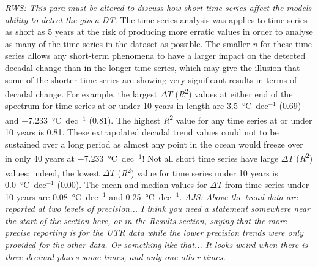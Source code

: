 \documentclass{ametsoc}
\begin{document}
\emph{RWS: This para must be altered to discuss how short time series affect the models ability to detect the given DT.}
The time series analysis was applies to time series as short as 5 years at the risk of producing more erratic values in order to analyse as many of the time series in the dataset as possible. The smaller \emph{n} for these time series allows any short-term phenomena to have a larger impact on the detected decadal change than in the longer time series, which may give the illusion that some of the shorter time series are showing very significant results in terms of decadal change. For example, the largest $\Delta T$ (\emph{R}\textsuperscript{2}) values at either end of the spectrum for time series at or under 10 years in length are \SI{3.5}{\degreeCelsius}~dec$^{-1}$ (0.69) and \SI{-7.233}{\degreeCelsius}~dec$^{-1}$ (0.81). The highest \emph{R}\textsuperscript{2} value for any time series at or under 10 years is 0.81. These extrapolated decadal trend values could not to be sustained over a long period as almost any point in the ocean would freeze over in only 40 years at \SI{-7.233}{\degreeCelsius}~dec$^{-1}$! Not all short time series have large $\Delta T$ (\emph{R}\textsuperscript{2}) values; indeed, the lowest $\Delta T$ (\emph{R}\textsuperscript{2}) value for time series under 10 years is \SI{0.0}{\degreeCelsius}~dec$^{-1}$ (0.00). The mean and median values for $\Delta T$ from time series under 10 years are \SI{0.08}{\degreeCelsius}~dec$^{-1}$ and \SI{0.25}{\degreeCelsius}~dec$^{-1}$.
\emph{AJS: Above the trend data are reported at two levels of precision... I think you need a statement somewhere near the start of the section here, or in the Results section, saying that the more precise reporting is for the UTR data while the lower precision trends were only provided for the other data. Or something like that... It looks weird when there is three decimal places some times, and only one other times.}
\end{document}
